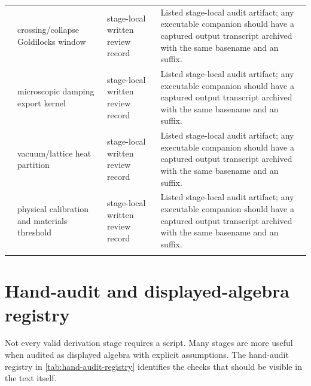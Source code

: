\begin{longtable}{@{}L{0.045\textwidth}L{0.21\textwidth}L{0.38\textwidth}L{0.30\textwidth}@{}}
 & crossing/collapse Goldilocks window & stage-local written review record & Listed stage-local audit artifact; any executable companion should have a captured output transcript archived with the same basename and an  suffix. \\
 & microscopic damping export kernel & stage-local written review record & Listed stage-local audit artifact; any executable companion should have a captured output transcript archived with the same basename and an  suffix. \\
 & vacuum/lattice heat partition & stage-local written review record & Listed stage-local audit artifact; any executable companion should have a captured output transcript archived with the same basename and an  suffix. \\
 & physical calibration and materials threshold & stage-local written review record & Listed stage-local audit artifact; any executable companion should have a captured output transcript archived with the same basename and an  suffix. \\
\addlinespace
\bottomrule
\end{longtable}
\normalsize

\section{Hand-audit and displayed-algebra registry}
\label{sec:hand-audit-registry}

Not every valid derivation stage requires a script.  Many stages are more useful when audited as displayed algebra with explicit assumptions.  The hand-audit registry in \cref{tab:hand-audit-registry} identifies the checks that should be visible in the text itself.

